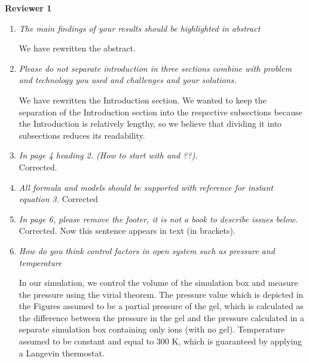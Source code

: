 \documentclass[12pt]{dinbrief}
\begin{document}
\addtolength{\textwidth}{1.5cm}
\addtolength{\textheight}{2.0cm}



\textbf{Reviewer 1}
\textit{}

\begin{enumerate}
\item \textit{The main findings of your results should be highlighted in abstract} 

We have rewritten the abstract. 

\item \textit{Please do not separate introduction in three sections combine with problem and technology you used and challenges and your solutions.}

We have rewritten the Introduction section.
We wanted to keep the separation of the Introduction section into the respective subsections because the Introduction is relatively lengthy, so we believe that dividing it into subsections reduces its readability.

\item \textit{In page 4 heading 2. (How to start with and ??)}.\\
Corrected.

\item \textit{All formula and models should be supported with reference for instant equation 3.}
Corrected

\item \textit{In page 6, please remove the footer, it is not a book to describe issues below}.\\
Corrected. Now this sentence appears in text (in brackets).

\item \textit{How do you think control factors in open system such as pressure and temperature}

In our simulation, we control the volume of the simulation box and measure the pressure using the virial theorem. The pressure value which is depicted in the Figures assumed to be a partial pressure of the gel, which is calculated as the difference between the pressure in the gel and the pressure calculated in a separate simulation box containing only ions (with no gel).
Temperature assumed to be constant and equal to 300 K, which is guaranteed by applying a Langevin thermostat.

\end{enumerate}
\end{document}
